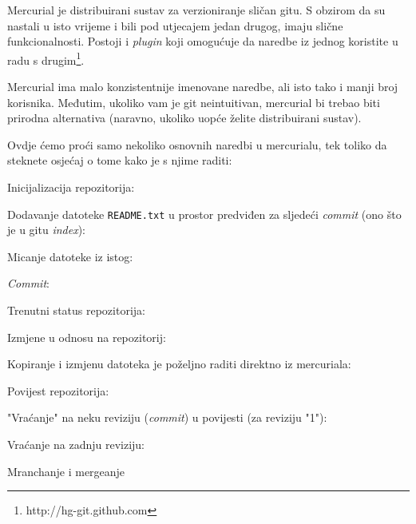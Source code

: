 Mercurial je distribuirani sustav za verzioniranje sličan gitu.
S obzirom da su nastali u isto vrijeme i bili pod utjecajem jedan drugog, imaju slične funkcionalnosti.
Postoji i \emph{plugin} koji omogućuje da naredbe iz jednog koristite u radu s drugim\footnote{http://hg-git.github.com}.

Mercurial ima malo konzistentnije imenovane naredbe, ali isto tako i manji broj korisnika.
Međutim, ukoliko vam je git neintuitivan, mercurial bi trebao biti prirodna alternativa (naravno, ukoliko uopće želite distribuirani sustav).

Ovdje ćemo proći samo nekoliko osnovnih naredbi u mercurialu, tek toliko da steknete osjećaj o tome kako je s njime raditi:

Inicijalizacija repozitorija:


Dodavanje datoteke \verb+README.txt+ u prostor predviđen za sljedeći \emph{commit} (ono što je u gitu \emph{index}):


Micanje datoteke iz istog:


\emph{Commit}:


Trenutni status repozitorija:


Izmjene u odnosu na repozitorij:


Kopiranje i izmjenu datoteka je poželjno raditi direktno iz mercuriala:


Povijest repozitorija:


"Vraćanje" na neku reviziju (\emph{commit}) u povijesti (za reviziju "1"):


Vraćanje na zadnju reviziju:


\TODO Mranchanje i mergeanje

